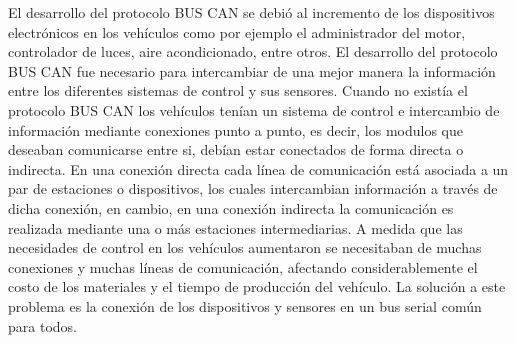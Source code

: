 El desarrollo del  protocolo BUS CAN se debió al incremento de los dispositivos electrónicos en los vehículos como por ejemplo el administrador del motor, controlador de luces, aire acondicionado, entre otros.  El desarrollo del protocolo BUS CAN fue necesario para intercambiar de una mejor manera la información entre los diferentes sistemas de control y sus sensores.
Cuando no existía el protocolo BUS CAN los vehículos tenían un sistema de control e intercambio de información mediante conexiones punto a punto, es decir, los modulos que deseaban comunicarse entre si, debían estar conectados de forma directa o indirecta.
En una conexión  directa  cada línea de comunicación está asociada a un par de estaciones o dispositivos, los cuales intercambian información a través de dicha conexión, en cambio, en una conexión indirecta  la comunicación es realizada  mediante una o más estaciones intermediarias.
A medida que las necesidades de control en los vehículos  aumentaron se necesitaban de muchas conexiones y muchas líneas de comunicación, afectando considerablemente el costo de los materiales y el tiempo de producción del vehículo. La solución a este problema es la conexión de los dispositivos y sensores en un bus serial común para todos.

